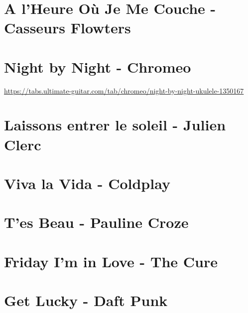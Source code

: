 \documentclass[11pt]{article}
\begin{document}
\section{A l'Heure Où Je Me Couche - Casseurs Flowters}
\begin{guitar}

\end{guitar}

\section*{Night by Night - Chromeo}
\begin{guitar}
\url{https://tabs.ultimate-guitar.com/tab/chromeo/night-by-night-ukulele-1350167}
\end{guitar}

\section{Laissons entrer le soleil - Julien Clerc}


\section{Viva la Vida - Coldplay}
\begin{guitar}

\end{guitar}



\section{T'es Beau - Pauline Croze}
\begin{guitar}

\end{guitar}


\section{Friday I'm in Love - The Cure}
\begin{guitar}

\end{guitar}


\section{Get Lucky - Daft Punk}

\end{document}
